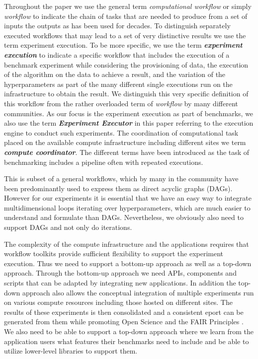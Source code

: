 Throughout the paper we use the general term {\em computational workflow} or simply {\em workflow} to indicate the chain of tasks that are needed to produce from a set of inputs the outputs \citep{def-workflow} as has been used for decades. To distinguish separately executed workflows that may lead to a set of very distinctive results we use the term experiment execution. To be more specific, we use the term {\bf\em experiment execution} to indicate a specific workflow that includes the execution of a benchmark experiment while considering the provisioning of data, the execution of the algorithm on the data to achieve a result, and the variation of the hyperparameters as part of the many different single executions run on the infrastructure to obtain the result. We distinguish this very specific definition of this workflow from the rather overloaded term of {\em workflow} by many different communities. As our focus is the experiment execution as part of benchmarks, we also use the term {\bf\em Experiment Executor} in this paper referring to the execution engine to conduct such experiments. The coordination of computational task placed on the available compute infrastructure including different sites we term {\bf\em compute coordinator}. The different terms have been introduced as the task of benchmarking includes a pipeline often with repeated executions. 

This is subset of a general workflows, which by many in the community have been 
predominantly used to express them as direct acyclic graphs (DAGs). However for our experiments it is essential that we have an easy way to integrate multidimensional loops iterating over hyperparameters, which are much easier to understand and formulate than DAGs. Nevertheless, we obviously also need to support DAGs and not only do iterations.

The complexity of the compute infrastructure and the applications requires that workflow toolkits provide sufficient flexibility to support the experiment execution. Thus we need to support a bottom-up approach as well as a top-down approach. Through the bottom-up approach we need APIs, components and scripts that can be adapted by integrating new applications. In addition the top-down approach also allows the conceptual integration of multiple experiments run on various compute resources including those hosted on different sites. The results of these experiments is then consolidated and a consistent  eport can be generated from them while promoting Open Science and the FAIR Principles \citep{wilkinson2016fair}. We also need to be able to support a top-down approach where we learn from the application users what features their benchmarks need to include and be able to utilize lower-level libraries to support them.

